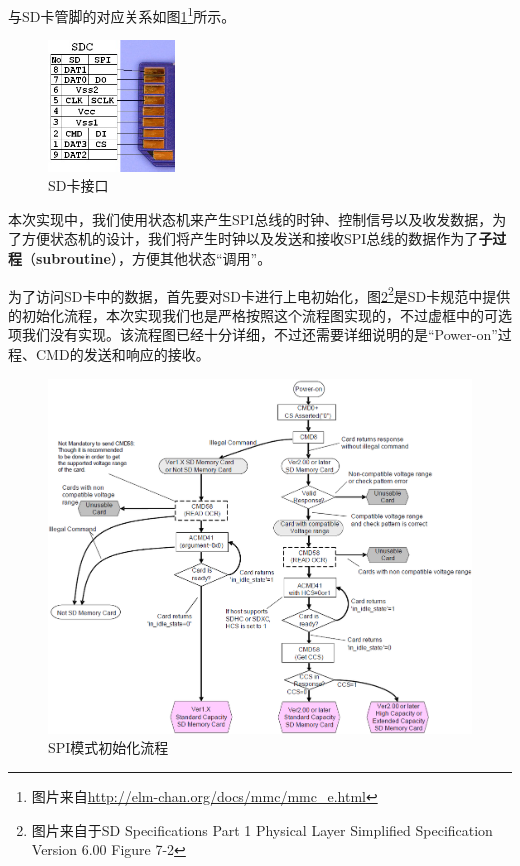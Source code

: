\documentclass[11pt,utf8]{report}
\begin{document}
	与SD卡管脚的对应关系如图\ref{sd}\footnote{图片来自\url{http://elm-chan.org/docs/mmc/mmc\_e.html}}所示。
	
	\begin{figure}[h!]
		\centering
		\includegraphics[width=0.3\textwidth]{sd}
		\caption{SD卡接口}
		\label{sd}
	\end{figure}
	
	\par 本次实现中，我们使用状态机来产生SPI总线的时钟、控制信号以及收发数据，为了方便状态机的设计，我们将产生时钟以及发送和接收SPI总线的数据作为了\textbf{子过程}（\textbf{subroutine}），方便其他状态“调用”。
	
	\par 为了访问SD卡中的数据，首先要对SD卡进行上电初始化，图\ref{spi_init}\footnote{图片来自于SD Specifications Part 1 Physical Layer Simplified Specification Version 6.00 Figure 7-2}是SD卡规范中提供的初始化流程，本次实现我们也是严格按照这个流程图实现的，不过虚框中的可选项我们没有实现。该流程图已经十分详细，不过还需要详细说明的是“Power-on”过程、CMD的发送和响应的接收。
	
	\begin{figure}[h!]
		\centering
		\includegraphics[width=\textwidth]{spi_init}
		\caption{SPI模式初始化流程}
		\label{spi_init}
	\end{figure}
	
\end{document}
